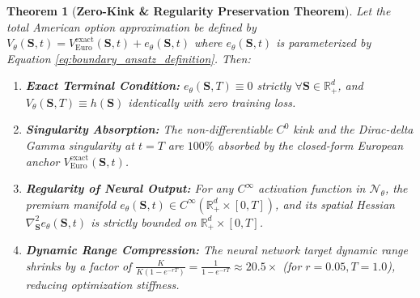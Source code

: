 \documentclass[11pt,a4paper]{article}
\newtheorem{theorem}{Theorem}
\begin{document}
\begin{theorem}[\textbf{Zero-Kink \& Regularity Preservation Theorem}]
\label{thm:zero_kink}
Let the total American option approximation be defined by $V_\theta(\mathbf{S}, t) = V_{\text{Euro}}^{\text{exact}}(\mathbf{S}, t) + e_\theta(\mathbf{S}, t)$ where $e_\theta(\mathbf{S}, t)$ is parameterized by Equation \eqref{eq:boundary_ansatz_definition}. Then:
\begin{enumerate}[label=(\roman*)]
    \item \textbf{Exact Terminal Condition:} $e_\theta(\mathbf{S}, T) \equiv 0$ strictly $\forall \mathbf{S} \in \mathbb{R}_+^d$, and $V_\theta(\mathbf{S}, T) \equiv h(\mathbf{S})$ identically with zero training loss.
    \item \textbf{Singularity Absorption:} The non-differentiable $C^0$ kink and the Dirac-delta Gamma singularity at $t=T$ are $100\%$ absorbed by the closed-form European anchor $V_{\text{Euro}}^{\text{exact}}(\mathbf{S}, t)$.
    \item \textbf{Regularity of Neural Output:} For any $C^\infty$ activation function in $\mathcal{N}_\theta$, the premium manifold $e_\theta(\mathbf{S}, t) \in C^\infty\left(\mathbb{R}_+^d \times [0, T]\right)$, and its spatial Hessian $\nabla^2_{\mathbf{S}} e_\theta(\mathbf{S}, t)$ is strictly bounded on $\mathbb{R}_+^d \times [0, T]$.
    \item \textbf{Dynamic Range Compression:} The neural network target dynamic range shrinks by a factor of $\frac{K}{K(1 - e^{-rT})} = \frac{1}{1 - e^{-rT}} \approx 20.5\times$ (for $r=0.05, T=1.0$), reducing optimization stiffness.
\end{enumerate}
\end{theorem}
\end{document}
